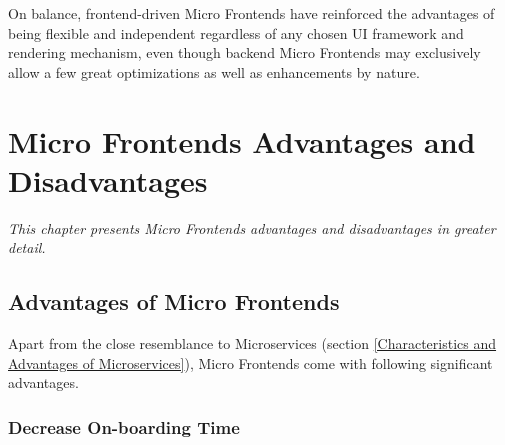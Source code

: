 \documentclass[a4paper]{book}
\begin{document}
On balance, frontend-driven Micro Frontends have reinforced the advantages of being flexible and independent regardless of any chosen UI framework and rendering mechanism, even though backend Micro Frontends may exclusively allow a few great optimizations as well as enhancements by nature.


\chapter{Micro Frontends Advantages and Disadvantages}
\textit{This chapter presents Micro Frontends advantages and disadvantages in greater detail.}
\section{Advantages of Micro Frontends}

Apart from the close resemblance to Microservices (section \ref{Characteristics and Advantages of Microservices}), Micro Frontends come with following significant advantages.

\subsection{Decrease On-boarding Time}
\end{document}
